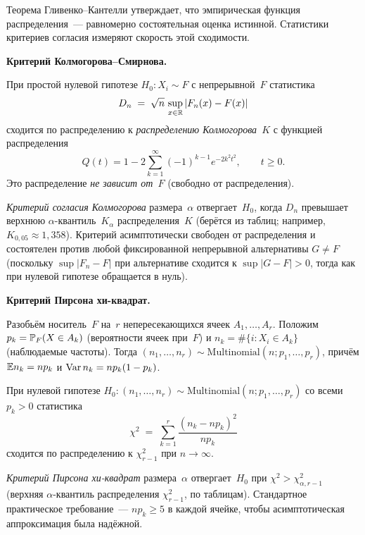 Теорема Гливенко--Кантелли утверждает, что эмпирическая функция распределения~--- равномерно состоятельная оценка истинной. Статистики критериев согласия измеряют скорость этой сходимости.

\medskip
\noindent\textbf{Критерий Колмогорова--Смирнова.}

\begin{theorem}[Колмогоров]
\label{thm:kolmogorov-test}
При простой нулевой гипотезе $H_0: X_i \sim F$ с непрерывной~$F$ статистика
\[
  D_n \;=\; \sqrt n\, \sup_{x \in \mathbb{R}} |F_n(x) - F(x)|
\]
сходится по распределению к \emph{распределению Колмогорова}~$K$ с функцией распределения
\[
  Q(t) = 1 - 2 \sum_{k=1}^{\infty} (-1)^{k-1} e^{-2 k^2 t^2}, \qquad t \geq 0.
\]
Это распределение \emph{не зависит от~$F$} (свободно от распределения).
\end{theorem}

\emph{Критерий согласия Колмогорова} размера~$\alpha$ отвергает~$H_0$, когда $D_n$ превышает верхнюю $\alpha$-квантиль~$K_\alpha$ распределения~$K$ (берётся из таблиц; например, $K_{0{,}05} \approx 1{,}358$). Критерий асимптотически свободен от распределения и состоятелен против любой фиксированной непрерывной альтернативы $G \neq F$ (поскольку $\sup |F_n - F|$ при альтернативе сходится к $\sup |G - F| > 0$, тогда как при нулевой гипотезе обращается в нуль).

\medskip
\noindent\textbf{Критерий Пирсона хи-квадрат.}

\begin{definition}
\label{def:multinomial}
Разобьём носитель~$F$ на~$r$ непересекающихся ячеек $A_1, \dots, A_r$. Положим $p_k = \mathbb{P}_F(X \in A_k)$ (вероятности ячеек при~$F$) и $n_k = \#\{i : X_i \in A_k\}$ (наблюдаемые частоты). Тогда $(n_1, \dots, n_r) \sim \mathrm{Multinomial}(n; p_1, \dots, p_r)$, причём $\mathbb{E} n_k = n p_k$ и $\operatorname{Var} n_k = n p_k (1 - p_k)$.
\end{definition}

\begin{theorem}
\label{thm:pearson-chi2}
При нулевой гипотезе $H_0 : (n_1, \dots, n_r) \sim \mathrm{Multinomial}(n; p_1, \dots, p_r)$ со всеми $p_k > 0$ статистика
\[
  \chi^2 \;=\; \sum_{k=1}^{r} \frac{(n_k - n p_k)^2}{n p_k}
\]
сходится по распределению к $\chi^2_{r - 1}$ при $n \to \infty$.
\end{theorem}

\emph{Критерий Пирсона хи-квадрат} размера~$\alpha$ отвергает~$H_0$ при $\chi^2 > \chi^2_{\alpha, r - 1}$ (верхняя $\alpha$-квантиль распределения $\chi^2_{r-1}$, по таблицам). Стандартное практическое требование~--- $n p_k \geq 5$ в каждой ячейке, чтобы асимптотическая аппроксимация была надёжной.

